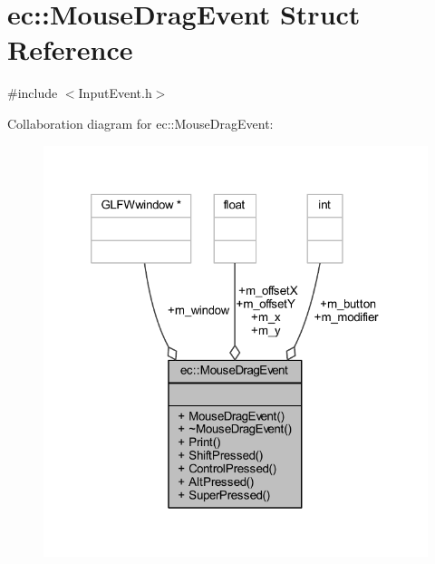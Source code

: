 \hypertarget{structec_1_1_mouse_drag_event}{}\section{ec\+:\+:Mouse\+Drag\+Event Struct Reference}
\label{structec_1_1_mouse_drag_event}


{\ttfamily \#include $<$Input\+Event.\+h$>$}



Collaboration diagram for ec\+:\+:Mouse\+Drag\+Event\+:\nopagebreak
\begin{figure}[H]
\begin{center}
\leavevmode
\includegraphics[width=320pt]{structec_1_1_mouse_drag_event__coll__graph}
\end{center}
\end{figure}
